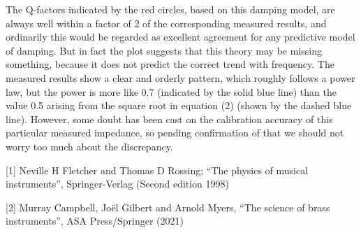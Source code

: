  The Q-factors indicated by the red circles, based on this damping model, are 
  always well within a factor of 2 of the corresponding measured results, and 
  ordinarily this would be regarded as excellent agreement for any predictive 
  model of damping. But in fact the plot suggests that this theory may be 
  missing something, because it does not predict the correct trend with 
  frequency. The measured results show a clear and orderly pattern, which 
  roughly follows a power law, but the power is more like 0.7 (indicated by the 
  solid blue line) than the value 0.5 arising from the square root in equation 
  (2) (shown by the dashed blue line). However, some doubt has been cast on the 
  calibration accuracy of this particular measured impedance, so pending 
  confirmation of that we should not worry too much about the discrepancy. 

  \sectionreferences{}[1] Neville H Fletcher and Thomas D Rossing; “The physics 
  of musical instruments”, Springer-Verlag (Second edition 1998) 

  [2] Murray Campbell, Joël Gilbert and Arnold Myers, “The science of brass 
  instruments”, ASA Press/Springer (2021) 